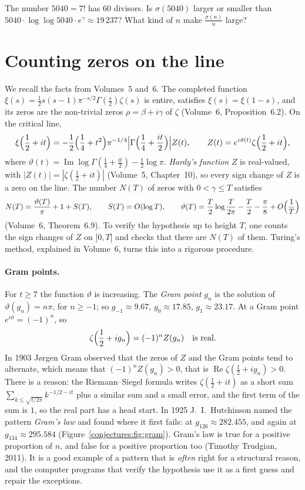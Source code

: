\begin{think}
The number $5040=7!$ has $60$ divisors. Is $\sigma(5040)$ larger or smaller than $5040\cdot\log\log5040\cdot e^\gamma\approx19\,237$? What kind of $n$
make $\frac{\sigma(n)}n$ large?
\end{think}

\section{Counting zeros on the line}

We recall the facts from Volumes~5 and~6. The completed function $\xi(s)=\frac12s(s-1)\pi^{-s/2}\Gamma(\frac s2)\zeta(s)$ is entire, satisfies
$\xi(s)=\xi(1-s)$, and its zeros are the non-trivial zeros $\rho=\beta+i\gamma$ of $\zeta$ (Volume~6, Proposition~6.2). On the critical line,
\[
\xi\Bigl(\frac12+it\Bigr)=-\frac12\Bigl(\frac14+t^2\Bigr)\pi^{-1/4}\Bigl|\Gamma\Bigl(\frac14+\frac{it}2\Bigr)\Bigr|Z(t),\qquad Z(t)=e^{i\vartheta(t)}\zeta\Bigl(\frac12+it\Bigr),
\]
where $\vartheta(t)=\operatorname{Im}\log\Gamma(\frac14+\frac{it}2)-\frac t2\log\pi$. \emph{Hardy's function} $Z$ is real-valued, with $|Z(t)|=|\zeta(\frac12+it)|$
(Volume~5, Chapter~10), so every sign change of $Z$ is a zero on the line. The number $N(T)$ of zeros with $0<\gamma\le T$ satisfies
\[
N(T)=\frac{\vartheta(T)}\pi+1+S(T),\qquad S(T)=O(\log T),\qquad\vartheta(T)=\frac T2\log\frac T{2\pi}-\frac T2-\frac\pi8+O\Bigl(\frac1T\Bigr)
\]
(Volume~6, Theorem~6.9). To verify the hypothesis up to height $T$, one counts the sign changes of $Z$ on $]0,T]$ and checks that there are $N(T)$ of
them. Turing's method, explained in Volume~6, turns this into a rigorous procedure.

\paragraph{Gram points.} For $t\ge7$ the function $\vartheta$ is increasing. The \emph{Gram point} $g_n$ is the solution of $\vartheta(g_n)=n\pi$, for
$n\ge-1$; so $g_{-1}\approx9.67$, $g_0\approx17.85$, $g_1\approx23.17$. At a Gram point $e^{i\vartheta}=(-1)^n$, so
\[
\zeta\Bigl(\frac12+ig_n\Bigr)=(-1)^nZ(g_n)\quad\text{is real}.
\]
In 1903 J\o rgen Gram observed that the zeros of $Z$ and the Gram points tend to alternate, which means that $(-1)^nZ(g_n)>0$, that is
$\operatorname{Re}\zeta(\frac12+ig_n)>0$. There is a reason: the Riemann--Siegel formula writes $\zeta(\frac12+it)$ as a short sum
$\sum_{k\le\sqrt{t/2\pi}}k^{-1/2-it}$ plus a similar sum and a small error, and the first term of the sum is $1$, so the real part has a head start. In 1925
J.~I.~Hutchinson named the pattern \emph{Gram's law} and found where it first fails: at $g_{126}\approx282.455$, and again at $g_{134}\approx295.584$
(Figure~\ref{conjectures:fig:gram}). Gram's law is true for a positive proportion of $n$, and false for a positive proportion too (Timothy Trudgian, 2011). It is a good example of a
pattern that is \emph{often} right for a structural reason, and the computer programs that verify the hypothesis use it as a first guess and repair the
exceptions.

